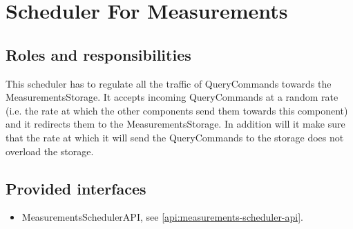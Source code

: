 \section{Scheduler For Measurements}
\label{element:scheduler-measurements}

\subsection{Roles and responsibilities}

\npar This scheduler has to regulate all the traffic of QueryCommands towards
the MeasurementsStorage. It accepts incoming QueryCommands at a random rate (i.e.
the rate at which the other components send them towards this component) and
it redirects them to the MeasurementsStorage. In addition will it make sure
that the rate at which it will send the QueryCommands to the storage does not
overload the storage.

\subsection{Provided interfaces}

\begin{itemize}
  \item MeasurementsSchedulerAPI, see \ref{api:measurements-scheduler-api}.
\end{itemize}



